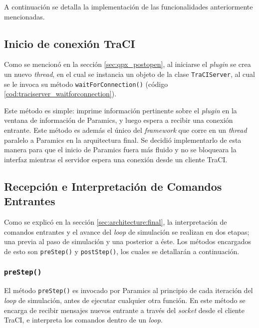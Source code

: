 A continuación se detalla la implementación de las funcionalidades anteriormente mencionadas.

\subsection{Inicio de conexión TraCI}

Como se mencionó en la sección \ref{sec:qpx_postopen}, al iniciarse el \emph{plugin} se crea un nuevo \emph{thread}, en el cual se instancia un objeto de la clase \texttt{TraCIServer}, al cual se le invoca su método \texttt{waitForConnection()} (código \ref{cod:traciserver_waitforconnection}).



Este método es simple: imprime información pertinente sobre el \emph{plugin} en la ventana de información de Paramics, y luego espera a recibir una conexión entrante. Este método es además el único del \emph{framework} que corre en un \emph{thread} paralelo a Paramics en la arquitectura final. Se decidió implementarlo de esta manera para que el inicio de Paramics fuera más fluido y no se bloqueara la interfaz mientras el servidor espera una conexión desde un cliente TraCI.

\subsection{Recepción e Interpretación de Comandos Entrantes}

Como se explicó en la sección \ref{sec:architecture:final}, la interpretación de comandos entrantes y el avance del \emph{loop} de simulación se realizan en dos etapas; una previa al paso de simulación y una posterior a éste. Los métodos encargados de esto son \texttt{preStep()} y \texttt{postStep()}, los cuales se detallarán a continuación.

\subsubsection{\texttt{preStep()}}

El método \texttt{preStep()} es invocado por Paramics al principio de cada iteración del \emph{loop} de simulación, antes de ejecutar cualquier otra función. En este método se encarga de recibir mensajes nuevos entrante a través del \emph{socket} desde el cliente TraCI, e interpreta los comandos dentro de un \emph{loop}. 


